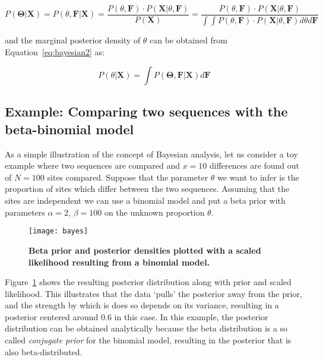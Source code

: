 \begin{equation}
P\left(\mathbf{\Theta}|\mathbf{X}\right)=P\left(\theta,\mathbf{F}|\mathbf{X}\right)=\frac{P\left(\theta,\mathbf{F}\right)\cdot P\left(\mathbf{X}|\theta,\mathbf{F}\right)}{P\left(\mathbf{X}\right)}=\frac{P\left(\theta,\mathbf{F}\right)\cdot P\left(\mathbf{X}|\theta,\mathbf{F}\right)}{\int\int P(\theta,\mathbf{F})\cdot P\left(\mathbf{X}|\theta,\mathbf{F}\right)d\theta d\mathbf{F}}
\label{eq:bayesian2}
\end{equation}

\noindent
and the marginal posterior density of $\theta$ can be obtained from Equation~\ref{eq:bayesian2} as:

\begin{equation}
P\left(\theta|\mathbf{X}\right)=\int P\left(\mathbf{\Theta},\mathbf{F}|\mathbf{X}\right)d\mathbf{F}
\label{eq:bayesian3}
\end{equation}

\subsection{Example: Comparing two sequences with the beta-binomial model}

As a simple illustration of the concept of Bayesian analysis, let us consider a toy example where two sequences are compared and $x=10$ differences are found out of $N=100$ sites compared.
Suppose that the parameter $\theta$ we want to infer is the proportion of sites which differ between the two sequences.
Assuming that the sites are independent we can use a binomial model and put a beta prior with parameters $\alpha=2$, $\beta=100$ on the unknown proportion $\theta$. %



\begin{figure}[H]
\centering
\texttt{[image: bayes]} 
\caption{
{ \footnotesize 
{\bf Beta prior and posterior densities plotted with a scaled likelihood resulting from a binomial model.} 
}%
}
\label{fig:bayes1}
\end{figure}

Figure~\ref{fig:bayes1} shows the resulting posterior distribution along with prior and scaled likelihood.
This illustrates that the data `pulls' the posterior away from the prior, and the strength by which is does so depends on its variance, resulting in a posterior centered around 0.6 in this case.
In this example, the posterior distribution can be obtained analytically because the beta distribution is a so called \emph{conjugate prior} for the binomial model, resulting in the posterior that is also beta-distributed.

